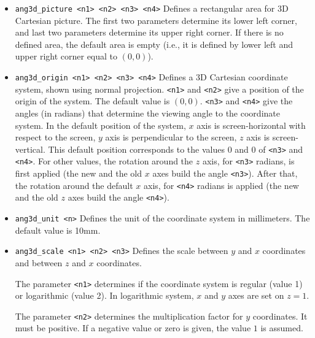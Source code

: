 \documentclass[a4paper]{book}
\begin{document}
\begin{itemize}
\item \verb|ang3d_picture <n1> <n2> <n3> <n4>|
        Defines a rectangular area for 3D Cartesian picture. The first two
        parameters determine its lower left corner, and last two parameters
        determine its upper right corner. If there is no defined area, the
        default area is empty (i.e., it is defined by lower left and upper right
        corner equal to $(0,0)$).


\item
\verb|ang3d_origin <n1> <n2> <n3> <n4>|
        Defines a 3D Cartesian coordinate system, shown using normal projection.
        \verb|<n1>| and \verb|<n2>| give a position of the origin of the system.
        The default value is $(0,0)$.
        \verb|<n3>| and \verb|<n4>| give the angles (in radians) that determine
        the viewing angle to the coordinate system. In the default position of
        the system, $x$ axis is screen-horizontal with respect to the screen,
        $y$ axis is perpendicular to the screen, $z$ axis is screen-vertical.
        This default position corresponds to the values $0$ and $0$ of
        \verb|<n3>| and \verb|<n4>|. For other values, the rotation
        around the $z$ axis, for \verb|<n3>| radians, is first applied (the
        new and the old $x$ axes build the angle \verb|<n3>|). After that,
        the rotation around the default $x$ axis, for \verb|<n4>| radians
        is applied (the new and the old $z$ axes build the angle \verb|<n4>|).

\item
\verb|ang3d_unit <n>|
        Defines the unit of the coordinate system in millimeters. The default value is 10mm.


\item
\verb|ang3d_scale <n1> <n2> <n3>|
        Defines the scale between $y$ and $x$ coordinates and between
        $z$ and $x$ coordinates.

        The parameter \verb|<n1>| determines if the coordinate system is regular (value 1)
        or logarithmic (value 2). In logarithmic system, $x$ and $y$ axes are set on $z=1$.

        The parameter \verb|<n2>| determines the multiplication factor for $y$ coordinates. It
        must be  positive. If a negative value or zero is given, the value $1$ is assumed.


\end{itemize}
\end{document}
